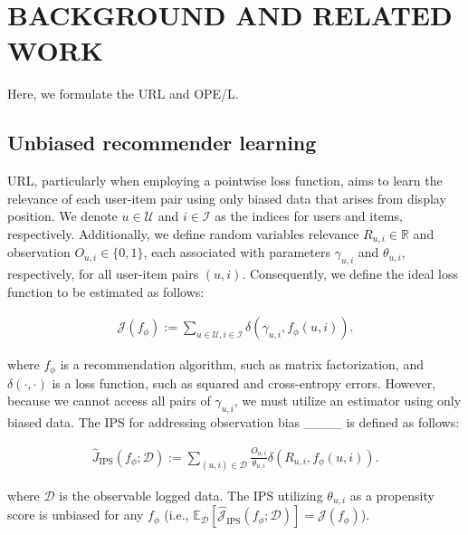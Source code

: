 \section{BACKGROUND AND RELATED WORK}
Here, we formulate the URL and OPE/L.

\subsection{Unbiased recommender learning}
URL, particularly when employing a pointwise loss function, aims to learn the relevance of each user-item pair using only biased data that arises from display position. We denote \( u \in \mathcal{U} \) and \( i \in \mathcal{I} \) as the indices for users and items, respectively. Additionally, we define random variables relevance \( R_{u,i} \in \mathbb{R} \) and observation \( O_{u,i} \in \{ 0, 1 \} \), each associated with parameters \( \gamma_{u,i} \) and \( \theta_{u,i} \), respectively, for all user-item pairs \( (u,i) \). Consequently, we define the ideal loss function to be estimated as follows:

\vspace{-5mm}
\begin{align*}
    \mathcal{J}(f_{\phi}) := \sum_{u \in \mathcal{U},i \in \mathcal{I}} \delta(\gamma_{u,i}, f_{\phi}(u,i)).
\end{align*}
\vspace{-5mm}

where \( f_{\phi} \) is a recommendation algorithm, such as matrix factorization, and \( \delta(\cdot,\cdot) \) is a loss function, such as squared and cross-entropy errors. However, because we cannot access all pairs of \( \gamma_{u,i} \), we must utilize an estimator using only biased data. The IPS for addressing observation bias ____ is defined as follows:

\vspace{-5mm}
\begin{align}
    \hat{J}_{\text{IPS}}(f_{\phi};\mathcal{D}) := \sum_{(u,i) \in \mathcal{D}} \frac{O_{u,i}}{\theta_{u,i}} \delta(R_{u,i}, f_{\phi}(u,i)).
\end{align}
\vspace{-3mm}

where \( \mathcal{D} \) is the observable logged data. The IPS utilizing \( \theta_{u,i} \) as a propensity score is unbiased for any \( f_{\phi} \) (i.e., \( \mathbb{E}_{\mathcal{D}}[\hat{\mathcal{J}}_{\text{IPS}}(f_{\phi};\mathcal{D})] = \mathcal{J}(f_{\phi}) \)).

